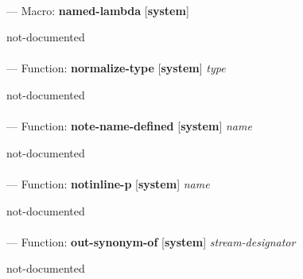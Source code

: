 \paragraph{}
\label{SYSTEM:NAMED-LAMBDA}
--- Macro: \textbf{named-lambda} [\textbf{system}] \textit{}

\begin{adjustwidth}{5em}{5em}
not-documented
\end{adjustwidth}

\paragraph{}
\label{SYSTEM:NORMALIZE-TYPE}
--- Function: \textbf{normalize-type} [\textbf{system}] \textit{type}

\begin{adjustwidth}{5em}{5em}
not-documented
\end{adjustwidth}

\paragraph{}
\label{SYSTEM:NOTE-NAME-DEFINED}
--- Function: \textbf{note-name-defined} [\textbf{system}] \textit{name}

\begin{adjustwidth}{5em}{5em}
not-documented
\end{adjustwidth}

\paragraph{}
\label{SYSTEM:NOTINLINE-P}
--- Function: \textbf{notinline-p} [\textbf{system}] \textit{name}

\begin{adjustwidth}{5em}{5em}
not-documented
\end{adjustwidth}

\paragraph{}
\label{SYSTEM:OUT-SYNONYM-OF}
--- Function: \textbf{out-synonym-of} [\textbf{system}] \textit{stream-designator}

\begin{adjustwidth}{5em}{5em}
not-documented
\end{adjustwidth}

